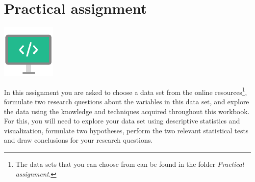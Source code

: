 
\begin{minipage}{0.8\textwidth}
\section{Practical assignment}
\end{minipage}%
\hfill%
\begin{minipage}{0.1\textwidth}
\includegraphics[width=\linewidth]{Files/Images/displaycode.pdf}
\end{minipage}
\vspace*{.1cm}

In this assignment you are asked to choose a data set from the online resources\footnote{The data sets that you can choose from can be found in the folder \textit{Practical assignment}.}, formulate two research questions about the variables in this data set, and explore the data using the knowledge and techniques acquired throughout this workbook. For this, you will need to explore your data set using descriptive statistics and visualization, formulate two hypotheses, perform the two relevant statistical tests and draw conclusions for your research questions. \\

